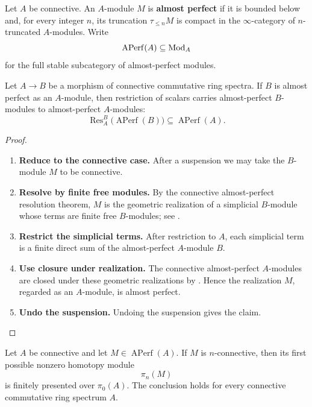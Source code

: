 \begin{definition}
\label{def:almost-perfect-module}
Let \(A\) be connective. An \(A\)-module \(M\) is \textbf{almost perfect} if
it is bounded below and, for every integer \(n\), its truncation
\(\tau_{\leq n}M\) is compact in the \(\infty\)-category of
\(n\)-truncated \(A\)-modules. Write
\[
    \operatorname{APerf}(A)\subseteq\operatorname{Mod}_A
\]
for the full stable subcategory of almost-perfect modules.
\end{definition}

\begin{lemma}
\label{lem:almost-perfect-restriction-transitivity}
Let \(A\to B\) be a morphism of connective commutative ring spectra. If
\(B\) is almost perfect as an \(A\)-module, then restriction of scalars
carries almost-perfect \(B\)-modules to almost-perfect \(A\)-modules:
\[
    \operatorname{Res}^B_A
    \bigl(\operatorname{APerf}(B)\bigr)
    \subseteq
    \operatorname{APerf}(A).
\]
\end{lemma}

\begin{proof}
\leavevmode
\begin{enumerate}[label=\textup{(\arabic*)}]
    \item \textbf{Reduce to the connective case.}
    After a suspension we may take the \(B\)-module \(M\) to be connective.
    \item \textbf{Resolve by finite free modules.}
    By the connective almost-perfect resolution theorem, \(M\) is the geometric
    realization of a simplicial \(B\)-module whose terms are finite free
    \(B\)-modules; see
    \cite[Proposition~7.2.4.11(5)]{LurieHigherAlgebra}.
    \item \textbf{Restrict the simplicial terms.}
    After restriction to \(A\),
    each simplicial term is a finite direct sum of the almost-perfect
    \(A\)-module \(B\).
    \item \textbf{Use closure under realization.}
    The connective almost-perfect \(A\)-modules are closed under these geometric
    realizations by \cite[Proposition~7.2.4.11(4)]{LurieHigherAlgebra}. Hence the realization \(M\), regarded as an
    \(A\)-module, is almost perfect.
    \item \textbf{Undo the suspension.}
    Undoing the suspension gives the claim.
\end{enumerate}
\end{proof}

\begin{lemma}
\label{lem:first-unresolved-homotopy-almost-perfect}
Let \(A\) be connective and let \(M\in\operatorname{APerf}(A)\). If
\(M\) is \(n\)-connective, then its first possible nonzero homotopy module
\[
    \pi_n(M)
\]
is finitely presented over \(\pi_0(A)\). The conclusion holds for every
connective commutative ring spectrum \(A\).
\end{lemma}

